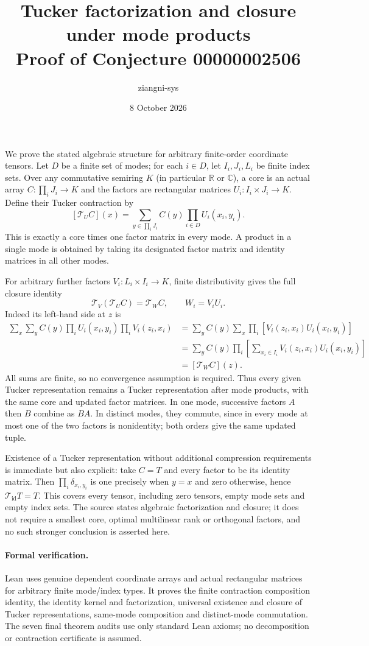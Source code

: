 \documentclass[11pt]{article}
\title{Tucker factorization and closure under mode products\\Proof of Conjecture 00000002506}
\author{ziangni-sys}\date{8 October 2026}
\begin{document}
\maketitle
We prove the stated algebraic structure for arbitrary finite-order coordinate tensors. Let $D$ be a finite set of modes; for each $i\in D$, let $I_i,J_i,L_i$ be finite index sets. Over any commutative semiring $K$ (in particular $\mathbb R$ or $\mathbb C$), a core is an actual array $C:\prod_iJ_i\to K$ and the factors are rectangular matrices $U_i:I_i\times J_i\to K$. Define their Tucker contraction by
\[
 [\mathcal T_U C](x)=\sum_{y\in\prod_iJ_i}C(y)\prod_{i\in D}U_i(x_i,y_i).
\]
This is exactly a core times one factor matrix in every mode. A product in a single mode is obtained by taking its designated factor matrix and identity matrices in all other modes.

For arbitrary further factors $V_i:L_i\times I_i\to K$, finite distributivity gives the full closure identity
\[
 \mathcal T_V(\mathcal T_U C)=\mathcal T_W C,
 \qquad W_i=V_iU_i.
\]
Indeed its left-hand side at $z$ is
\begin{align*}
 \sum_x\sum_y C(y)\prod_i U_i(x_i,y_i)\prod_i V_i(z_i,x_i)
 &=\sum_y C(y)\sum_x\prod_i[V_i(z_i,x_i)U_i(x_i,y_i)]\\
 &=\sum_y C(y)\prod_i\left[\sum_{x_i\in I_i}V_i(z_i,x_i)U_i(x_i,y_i)\right]\\
 &= [\mathcal T_W C](z).
\end{align*}
All sums are finite, so no convergence assumption is required. Thus every given Tucker representation remains a Tucker representation after mode products, with the same core and updated factor matrices. In one mode, successive factors $A$ then $B$ combine as $BA$. In distinct modes, they commute, since in every mode at most one of the two factors is nonidentity; both orders give the same updated tuple.

Existence of a Tucker representation without additional compression requirements is immediate but also explicit: take $C=T$ and every factor to be its identity matrix. Then $\prod_i\delta_{x_i,y_i}$ is one precisely when $y=x$ and zero otherwise, hence $\mathcal T_{\mathrm{id}}T=T$. This covers every tensor, including zero tensors, empty mode sets and empty index sets. The source states algebraic factorization and closure; it does not require a smallest core, optimal multilinear rank or orthogonal factors, and no such stronger conclusion is asserted here.

\paragraph{Formal verification.} Lean uses genuine dependent coordinate arrays and actual rectangular matrices for arbitrary finite mode/index types. It proves the finite contraction composition identity, the identity kernel and factorization, universal existence and closure of Tucker representations, same-mode composition and distinct-mode commutation. The seven final theorem audits use only standard Lean axioms; no decomposition or contraction certificate is assumed.
\end{document}
